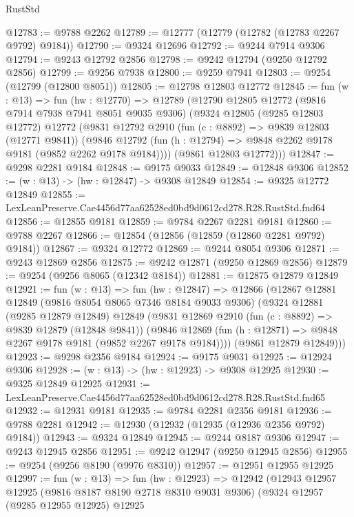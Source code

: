 \begin{lexlean}{RustStd}
\begin{coremodule}
@12783 := @9788 @2262
@12789 := @12777 (@12779 (@12782 (@12783 @2267 @9792) @9184))
@12790 := @9324 @12696
@12792 := @9244 @7914 @9306
@12794 := @9243 @12792 @2856
@12798 := @9242 @12794 (@9250 @12792 @2856)
@12799 := @9256 @7938
@12800 := @9259 @7941
@12803 := @9254 (@12799 (@12800 @8051))
@12805 := @12798 @12803 @12772
@12845 := fun (w : @13) =>
  fun (hw : @12770) =>
  @12789
    (@12790
      @12805
      @12772
      (@9816 @7914 @7938 @7941 @8051 @9035 @9306)
      (@9324
        @12805
        (@9285 @12803 @12772)
        @12772
        (@9831
          @12792
          @2910
          (fun (c : @8892) => @9839 @12803 (@12771 @9841))
          (@9846 @12792 (fun (h : @12794) => @9848 @2262 @9178 @9181 (@9852 @2262 @9178 @9184))))
        (@9861 @12803 @12772)))
@12847 := @9298 @2281 @9184
@12848 := @9175 @9033
@12849 := @12848 @9306
@12852 := (w : @13) -> (hw : @12847) -> @9308 @12849
@12854 := @9325 @12772 @12849
@12855 := LexLeanPreserve.Cae4456d77aa62528ed0bd9d0612cd278.R28.RustStd.fnd64
@12856 := @12855 @9181
@12859 := @9784 @2267 @2281 @9181
@12860 := @9788 @2267
@12866 := @12854 (@12856 (@12859 (@12860 @2281 @9792) @9184))
@12867 := @9324 @12772
@12869 := @9244 @8054 @9306
@12871 := @9243 @12869 @2856
@12875 := @9242 @12871 (@9250 @12869 @2856)
@12879 := @9254 (@9256 @8065 (@12342 @8184))
@12881 := @12875 @12879 @12849
@12921 := fun (w : @13) =>
  fun (hw : @12847) =>
  @12866
    (@12867
      @12881
      @12849
      (@9816 @8054 @8065 @7346 @8184 @9033 @9306)
      (@9324
        @12881
        (@9285 @12879 @12849)
        @12849
        (@9831
          @12869
          @2910
          (fun (c : @8892) => @9839 @12879 (@12848 @9841))
          (@9846 @12869 (fun (h : @12871) => @9848 @2267 @9178 @9181 (@9852 @2267 @9178 @9184))))
        (@9861 @12879 @12849)))
@12923 := @9298 @2356 @9184
@12924 := @9175 @9031
@12925 := @12924 @9306
@12928 := (w : @13) -> (hw : @12923) -> @9308 @12925
@12930 := @9325 @12849 @12925
@12931 := LexLeanPreserve.Cae4456d77aa62528ed0bd9d0612cd278.R28.RustStd.fnd65
@12932 := @12931 @9181
@12935 := @9784 @2281 @2356 @9181
@12936 := @9788 @2281
@12942 := @12930 (@12932 (@12935 (@12936 @2356 @9792) @9184))
@12943 := @9324 @12849
@12945 := @9244 @8187 @9306
@12947 := @9243 @12945 @2856
@12951 := @9242 @12947 (@9250 @12945 @2856)
@12955 := @9254 (@9256 @8190 (@9976 @8310))
@12957 := @12951 @12955 @12925
@12997 := fun (w : @13) =>
  fun (hw : @12923) =>
  @12942
    (@12943
      @12957
      @12925
      (@9816 @8187 @8190 @2718 @8310 @9031 @9306)
      (@9324
        @12957
        (@9285 @12955 @12925)
        @12925

\end{coremodule}
\end{lexlean}
